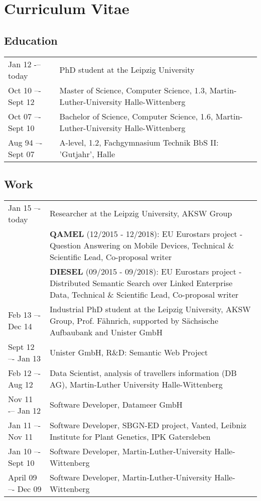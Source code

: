 \chapter*{Curriculum Vitae}

\section*{Education}
\begin{tabular}{p{3cm}p{10cm}}	
Jan 12 -– today		&  	PhD student at the Leipzig University\\
Oct 10 –- Sept 12		&  	Master of Science, Computer Science, 1.3, Martin-Luther-University Halle-Wittenberg\\
Oct 07 –- Sept 10		&  	Bachelor of Science, Computer Science, 1.6, Martin-Luther-University Halle-Wittenberg\\
Aug 94 –- Sept 07		&  	A-level, 1.2, Fachgymnasium Technik BbS II: 'Gutjahr', Halle\\
\end{tabular}

\section*{Work}
\begin{tabular}{p{3cm}p{10cm}}	
Jan 15 –- today      & Researcher at the Leipzig University, AKSW Group \\
&  \textbf{QAMEL} (12/2015 - 12/2018): EU Eurostars project - Question Answering on Mobile Devices, Technical \& Scientific Lead, Co-proposal writer\\
& \textbf{DIESEL} (09/2015 - 09/2018): EU Eurostars project - Distributed Semantic Search over Linked Enterprise Data, Technical \& Scientific Lead, Co-proposal writer\\
Feb 13 –- Dec 14     & Industrial PhD student at the Leipzig University, AKSW Group, Prof. Fähnrich, supported by Sächsische Aufbaubank and Unister GmbH\\
Sept 12 –- Jan 13    & Unister GmbH, R\&D: Semantic Web Project\\
Feb 12 –- Aug 12	    & Data Scientist, analysis of travellers information (DB AG), Martin-Luther University Halle-Wittenberg\\
Nov 11 -– Jan 12	    & Software Developer, Datameer GmbH\\
Jan 11 –- Nov 11	    & Software Developer, SBGN-ED project, Vanted, Leibniz Institute for Plant Genetics, IPK Gatersleben\\
Jan 10 –- Sept 10	& Software Developer, Martin-Luther-University Halle-Wittenberg\\
April 09 –- Dec 09	& Software Developer, Martin-Luther-University Halle-Wittenberg\\
\end{tabular}

